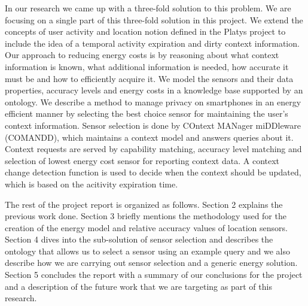 \documentclass{ubicomp2013}
\begin{document}
In our research we came up with a three-fold solution to this problem. We are focusing on a single part of this three-fold solution in this project. We extend the concepts of user activity and location notion defined in the Platys project to include the idea of a temporal activity expiration and dirty context information. Our approach to reducing energy costs is by reasoning about what context information is known, what additional information is needed, how accurate it must be and how to efficiently acquire it. We model the sensors and their data properties, accuracy levels and energy costs in a knowledge base supported by an ontology. We describe a method to manage privacy on smartphones in an energy efficient manner by selecting the best choice sensor for maintaining the user's context information. Sensor selection is done by COntext MANager miDDleware (COMANDD), which maintains a context model and answers queries about it. Context requests are served by capability matching, accuracy level matching and selection of lowest energy cost sensor for reporting context data. A context change detection function is used to decide when the context should be updated, which is based on the acitivity expiration time.

The rest of the project report is organized as follows. Section 2 explains the previous work done. Section 3 briefly mentions the methodology used for the creation of the energy model and relative accuracy values of location sensors. Section 4 dives into the sub-solution of sensor selection and describes the ontology that allows us to select a sensor using an example query and we also describe how we are carrying out sensor selection and a generic energy solution. Section 5 concludes the report with a summary of our conclusions for the project and a description of the future work that we are targeting as part of this research. 
\end{document}
